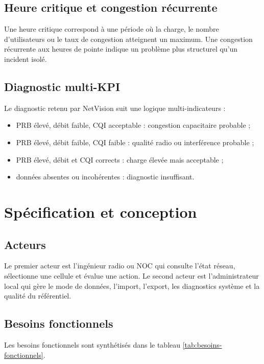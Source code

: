 \documentclass[12pt,a4paper,oneside]{report}
\begin{document}
\section{Heure critique et congestion récurrente}
Une heure critique correspond à une période où la charge, le nombre d'utilisateurs ou le taux de congestion atteignent un maximum. Une congestion récurrente aux heures de pointe indique un problème plus structurel qu'un incident isolé.

\section{Diagnostic multi-KPI}
Le diagnostic retenu par NetVision suit une logique multi-indicateurs :
\begin{itemize}
    \item PRB élevé, débit faible, CQI acceptable : congestion capacitaire probable ;
    \item PRB élevé, débit faible, CQI faible : qualité radio ou interférence probable ;
    \item PRB élevé, débit et CQI corrects : charge élevée mais acceptable ;
    \item données absentes ou incohérentes : diagnostic insuffisant.
\end{itemize}

\chapter{Spécification et conception}
\section{Acteurs}
Le premier acteur est l'ingénieur radio ou NOC qui consulte l'état réseau, sélectionne une cellule et évalue une action. Le second acteur est l'administrateur local qui gère le mode de données, l'import, l'export, les diagnostics système et la qualité du référentiel.

\section{Besoins fonctionnels}
Les besoins fonctionnels sont synthétisés dans le tableau \ref{tab:besoins-fonctionnels}.
\end{document}
